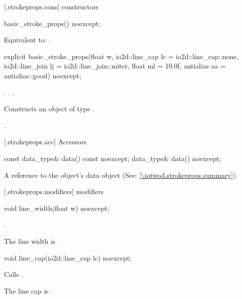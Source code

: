  [\iotwod.strokeprops.cons] { constructors}

%
\begin{itemdecl}
basic_stroke_props() noexcept;
\end{itemdecl}
\begin{itemdescr}
\pnum
\effects
Equivalent to: .
\end{itemdescr}

%
\begin{itemdecl}
explicit basic_stroke_props(float w, io2d::line_cap lc = io2d::line_cap::none,
  io2d::line_join lj = io2d::line_join::miter,
  float ml = 10.0f, antialias aa = antialias::good) noexcept;
\end{itemdecl}
\begin{itemdescr}
\pnum
\requires
{}. . .

\pnum
\effects
Constructs an object of type .

\pnum
\postconditions
{}.
\end{itemdescr}

 [\iotwod.strokeprops.acc] {Accessors}

%
\begin{itemdecl}
const data_type& data() const noexcept;
data_type& data() noexcept;
\end{itemdecl}
\begin{itemdescr}
\pnum
\returns A reference to the  object's data object (See: \ref{\iotwod.strokeprops.summary}).
\end{itemdescr}

 [\iotwod.strokeprops.modifiers] { modifiers}

%
\begin{itemdecl}
void line_width(float w) noexcept;
\end{itemdecl}
\begin{itemdescr}
\pnum
\requires
{}.

\pnum
\effects
The line width is .
\end{itemdescr}

%
\begin{itemdecl}
void line_cap(io2d::line_cap lc) noexcept;
\end{itemdecl}
\begin{itemdescr}
\pnum
\effects
Calls .

\remarks
The line cap is .
\end{itemdescr}

